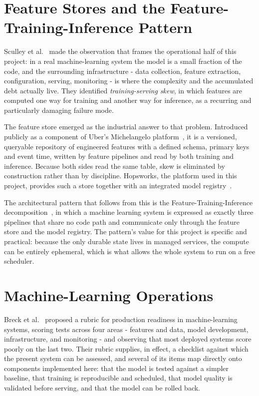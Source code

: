 \section{Feature Stores and the Feature-Training-Inference Pattern}
Sculley et al.~\cite{ref:techdebt} made the observation that frames the
operational half of this project: in a real machine-learning system the model is
a small fraction of the code, and the surrounding infrastructure - data
collection, feature extraction, configuration, serving, monitoring - is where
the complexity and the accumulated debt actually live. They identified
\emph{training-serving skew}, in which features are computed one way for
training and another way for inference, as a recurring and particularly damaging
failure mode.

The feature store emerged as the industrial answer to that problem. Introduced
publicly as a component of Uber's Michelangelo platform~\cite{ref:michelangelo},
it is a versioned, queryable repository of engineered features with a defined
schema, primary keys and event time, written by feature pipelines and read by
both training and inference. Because both sides read the same table, skew is
eliminated by construction rather than by discipline. Hopsworks, the platform used
in this project, provides such a store together with an integrated model
registry~\cite{ref:hopsworks}.

The architectural pattern that follows from this is the
Feature-Training-Inference decomposition~\cite{ref:fti}, in which a machine
learning system is expressed as exactly three pipelines that share no code path
and communicate only through the feature store and the model registry. The
pattern's value for this project is specific and practical: because the only
durable state lives in managed services, the compute can be entirely ephemeral,
which is what allows the whole system to run on a free scheduler.

\section{Machine-Learning Operations}
Breck et al.~\cite{ref:mltestscore} proposed a rubric for production readiness in
machine-learning systems, scoring tests across four areas - features and data,
model development, infrastructure, and monitoring - and observing that most
deployed systems score poorly on the last two. Their rubric supplies, in effect,
a checklist against which the present system can be assessed, and several of its
items map directly onto components implemented here: that the model is tested
against a simpler baseline, that training is reproducible and scheduled, that
model quality is validated before serving, and that the model can be rolled back.

